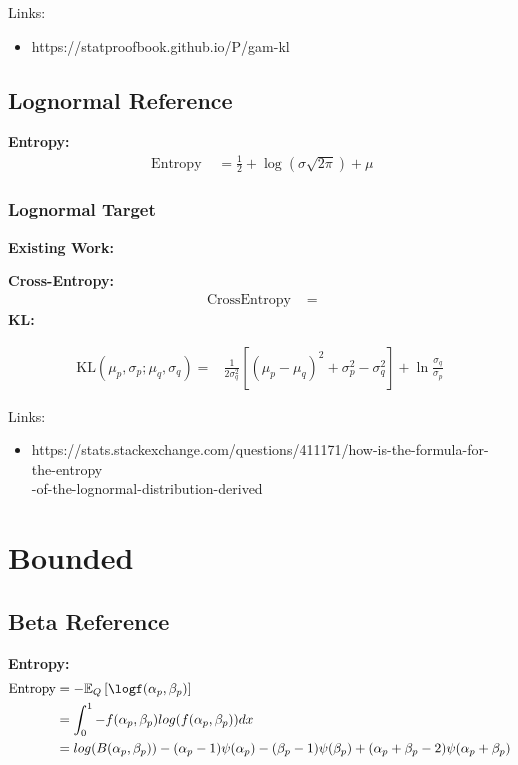 \documentclass{article}
\begin{document}
Links:
\begin{itemize}
    \item https://statproofbook.github.io/P/gam-kl
\end{itemize}

\subsection{Lognormal Reference}

\noindent \textbf{Entropy:}
$$ \begin{aligned} \text { Entropy }&=\frac{1}{2}+\log (\sigma \sqrt{2 \pi})+\mu
\end{aligned} $$

\subsubsection{Lognormal Target}

\noindent \textbf{Existing Work:}

\noindent \textbf{Cross-Entropy:}
$$ \begin{aligned} \text { CrossEntropy }&=
\end{aligned} $$
\noindent \textbf{KL:}

$$ \begin{aligned}
\mathrm{KL}\left(\mu_{p}, \sigma_{p} ; \mu_{q}, \sigma_{q}\right)=&\frac{1}{2 \sigma_{q}^{2}}\left[\left(\mu_{p}-\mu_{q}\right)^{2}+\sigma_{p}^{2}-\sigma_{q}^{2}\right]+\ln \frac{\sigma_{q}}{\sigma_{p}}
\end{aligned} $$

Links:
\begin{itemize}
 \item  https://stats.stackexchange.com/questions/411171/how-is-the-formula-for-the-entropy\\-of-the-lognormal-distribution-derived
\end{itemize}

\section{Bounded}

\subsection{Beta Reference}

\noindent \textbf{Entropy:}
$$ \begin{aligned} \text{Entropy}&=-\mathbb{E}_{Q}\left[\logf(\alpha_{p},\beta_{p})\right]\\&=\int_{0}^{1}-f(\alpha_{p},\beta_{p})log(f(\alpha_{p},\beta_{p}))dx\\&=log(B(\alpha_{p},\beta_{p}))-(\alpha_{p}-1)\psi(\alpha_{p})-(\beta_{p}-1)\psi(\beta_{p})+(\alpha_{p}+\beta_{p}-2)\psi(\alpha_{p}+\beta_{p})
\end{aligned} $$
\end{document}
